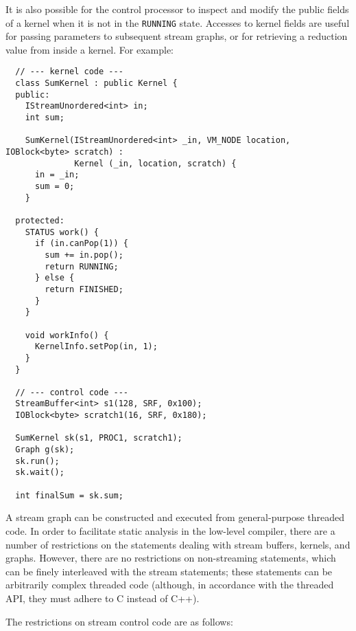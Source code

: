 It is also possible for the control processor to inspect and modify
the public fields of a kernel when it is not in the {\tt RUNNING}
state.  Accesses to kernel fields are useful for passing parameters to
subsequent stream graphs, or for retrieving a reduction value from
inside a kernel.  For example: 
{\small
\begin{verbatim}
  // --- kernel code ---
  class SumKernel : public Kernel {
  public:
    IStreamUnordered<int> in;
    int sum;

    SumKernel(IStreamUnordered<int> _in, VM_NODE location, IOBlock<byte> scratch) : 
              Kernel (_in, location, scratch) {
      in = _in;
      sum = 0;
    }

  protected:
    STATUS work() {
      if (in.canPop(1)) {
        sum += in.pop();
        return RUNNING;
      } else {
        return FINISHED;
      }
    }

    void workInfo() {
      KernelInfo.setPop(in, 1);
    }
  }

  // --- control code ---
  StreamBuffer<int> s1(128, SRF, 0x100);
  IOBlock<byte> scratch1(16, SRF, 0x180);

  SumKernel sk(s1, PROC1, scratch1);
  Graph g(sk);
  sk.run();
  sk.wait();

  int finalSum = sk.sum;
\end{verbatim}}


A stream graph can be constructed and executed from general-purpose
threaded code.  In order to facilitate static analysis in the
low-level compiler, there are a number of restrictions on the
statements dealing with stream buffers, kernels, and graphs.  However,
there are no restrictions on non-streaming statements, which can be
finely interleaved with the stream statements; these statements can be
arbitrarily complex threaded code (although, in accordance with the
threaded API, they must adhere to C instead of C++).

The restrictions on stream control code are as follows:

